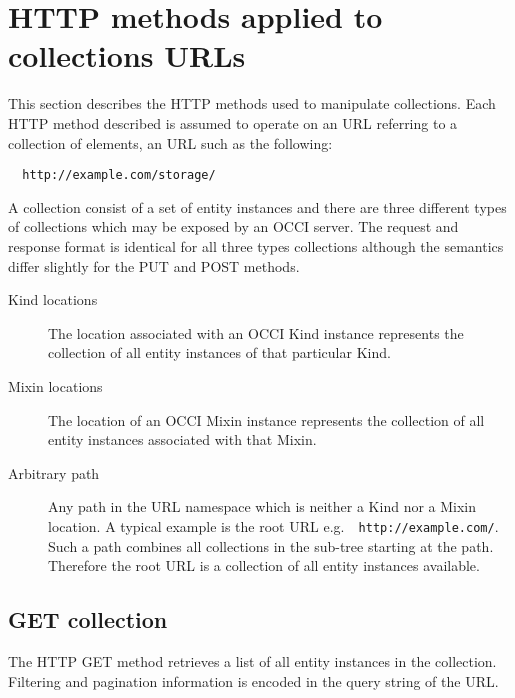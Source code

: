 \documentclass[10pt,a4paper]{article}
\begin{document}
\section{HTTP methods applied to collections URLs}


This section describes the HTTP methods used to manipulate collections. Each
HTTP method described is assumed to operate on an URL referring to a collection
of elements, an URL such as the following:
\begin{verbatim}
  http://example.com/storage/
\end{verbatim}

A collection consist of a set of entity instances and there are three
different types of collections which may be exposed by an OCCI server.  The
request and response format is identical for all three types collections
although the semantics differ slightly for the PUT and POST methods.
\begin{description}
\item[Kind locations] The location associated with an OCCI Kind instance
represents the collection of all entity instances of that particular Kind.
\item[Mixin locations] The location of an OCCI Mixin instance represents the
collection of all entity instances associated with that Mixin.
\item[Arbitrary path] Any path in the URL namespace which is neither a Kind nor
a Mixin location. A typical example is the root URL e.g.~{\tt
http://example.com/}. Such a path combines all collections in the sub-tree
starting at the path. Therefore the root URL is a collection of all entity
instances available.
\end{description}

\subsection{GET collection}
The HTTP GET method retrieves a list of all entity instances in the
collection. Filtering and pagination information is encoded in the query string
of the URL.
\end{document}
